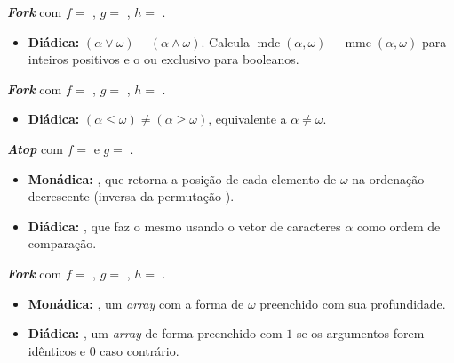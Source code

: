 {\begin{Qlist}
    \item[(i)] 

    \begin{solution}
    \textbf{\textit{Fork}} com $f=$ , $g=$ , $h=$ .
    \begin{itemize}
        \item \textbf{Diádica:} $(\alpha\lor\omega)-(\alpha\land\omega)$. Calcula $\operatorname{mdc}(\alpha,\omega)-\operatorname{mmc}(\alpha,\omega)$ para inteiros positivos e o ou exclusivo para booleanos.
    \end{itemize}
    \end{solution}

    \item[(j)] 

    \begin{solution}
    \textbf{\textit{Fork}} com $f=$ , $g=$ , $h=$ .
    \begin{itemize}
        \item \textbf{Diádica:} $(\alpha\leq\omega)\neq(\alpha\geq\omega)$, equivalente a $\alpha\neq\omega$.
    \end{itemize}
    \end{solution}

    \item[(k)] 

    \begin{solution}
    \textbf{\textit{Atop}} com $f=$  e $g=$ .
    \begin{itemize}
        \item \textbf{Monádica:} , que retorna a posição de cada elemento de $\omega$ na ordenação decrescente (inversa da permutação ).
        \item \textbf{Diádica:} , que faz o mesmo usando o vetor de caracteres $\alpha$ como ordem de comparação.
    \end{itemize}
    \end{solution}

    \item[(l)] 

    \begin{solution}
    \textbf{\textit{Fork}} com $f=$ , $g=$ , $h=$ .
    \begin{itemize}
        \item \textbf{Monádica:} , um \emph{array} com a forma de $\omega$ preenchido com sua profundidade.
        \item \textbf{Diádica:} , um \emph{array} de forma  preenchido com $1$ se os argumentos forem idênticos e $0$ caso contrário.
    \end{itemize}
    \end{solution}


\end{Qlist}}
